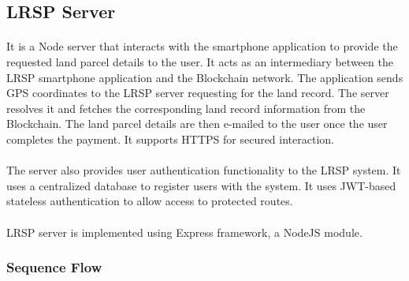 \documentclass{article}
\begin{document}
    \subsection{LRSP Server}
        \paragraph{}
        It is a Node server that interacts with the smartphone application to provide the requested land parcel details to the user. It acts as an intermediary between the LRSP smartphone application and the Blockchain network. The application sends GPS coordinates to the LRSP server requesting for the land record. The server resolves it and fetches the corresponding land record information from the Blockchain. The land parcel details are then e-mailed to the user once the user completes the payment. It supports HTTPS for secured interaction.
        
        \paragraph{}
        The server also provides user authentication functionality to the LRSP system. It uses a centralized database to register users with the system. It uses JWT-based stateless authentication to allow access to protected routes.

        \paragraph{}
        LRSP server is implemented using Express framework, a NodeJS module.
        
        \subsubsection{Sequence Flow}
\end{document}
